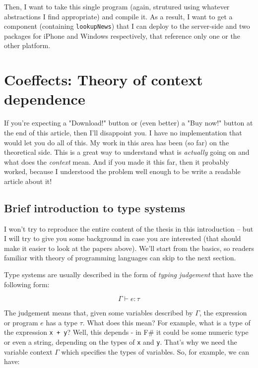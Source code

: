 Then, I want to take this single program (again, strutured using whatever abstractions
I find appropriate) and compile it. As a result, I want to get a component (containing
\texttt{lookupNews}) that I can deploy to the server-side and two packages for iPhone and 
Windows respectively, that reference only one or the other platform.


\section{Coeffects: Theory of context dependence}

If you're expecting a "Download!" button or (even better) a "Buy now!" button at the end of this article,
then I'll disappoint you. I have no implementation that would let you do all of this.
My work in this area has been (so far) on the theoretical side. This is a great way to 
understand what is \emph{actually} going on and what does the \emph{context} mean. And if you made
it this far, then it probably worked, because I understood the problem well enough to be 
write a readable article about it!

\subsection{Brief introduction to type systems}

I won't try to reproduce the entire content of the thesis in this introduction -- but I will
try to give you some background in case you are interested (that should make it easier to
look at the papers above). We'll start from the basics, so readers familiar with theory of 
programming languages can skip to the next section.

Type systems are usually described in the form of \emph{typing judgement} that have the following form:

\begin{equation}
\Gamma \vdash e : \tau
\end{equation}

The judgement means that, given some variables described by $\Gamma$, the expression or program $e$
has a type $\tau$. What does this mean? For example, what is a type of the expression \texttt{x + y}?
Well, this depends - in F\# it could be some numeric type or even a string, depending on the types
of \texttt{x} and \texttt{y}. That's why we need the variable context $\Gamma$ which specifies the types of variables.
So, for example, we can have:

